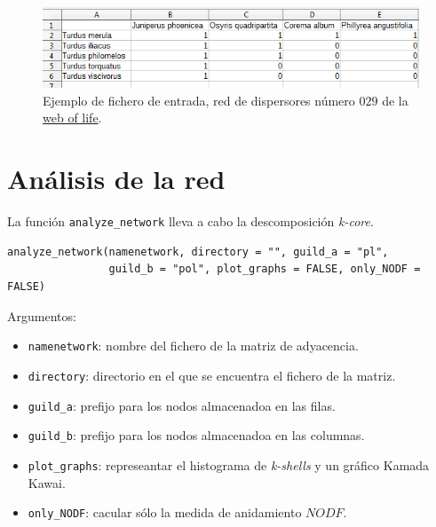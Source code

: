 \begin{figure}[h!]
\centering
\includegraphics[scale=0.8]{ManFigs/SD_029_csv.png}
\caption {Ejemplo de fichero de entrada, red de dispersores número $029$ de la \href{http://www.web-of-life.es/}{web of life}.}
\label{fig:AKMAN_red_example}
\end{figure}

\section{Análisis de la red}
\label{network_analysis}

La función \texttt{analyze\_network} lleva a cabo la descomposición \textit{k-core}.

\fontsize{3.5mm}{3.5mm}\selectfont
\begin{verbatim}
analyze_network(namenetwork, directory = "", guild_a = "pl",
                guild_b = "pol", plot_graphs = FALSE, only_NODF = FALSE)
\end{verbatim}
\normalsize

Argumentos:
\small
\begin{itemize}

\item \texttt{namenetwork}: nombre del fichero de la matriz de adyacencia.
	
\item \texttt{directory}: directorio en el que se encuentra el fichero de la matriz.

\item \texttt{guild\_a}: prefijo para los nodos almacenadoa en las filas.

\item \texttt{guild\_b}: prefijo para los nodos almacenadoa en las columnas.

\item \texttt{plot\_graphs}: represeantar el histograma de \textit{k-shells} y un gráfico Kamada Kawai.

\item \texttt{only\_NODF}: cacular sólo la medida de anidamiento $NODF$.

\end{itemize}

